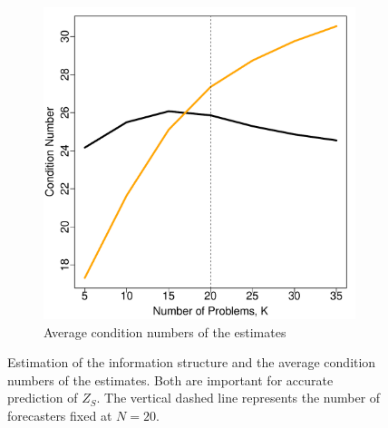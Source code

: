 \documentclass[11pt]{article}
\theoremstyle{definition}
\theoremstyle{definition}
\begin{document}
\begin{figure}[t!]
\begin{subfigure}{0.5\textwidth}
                \includegraphics[width=\textwidth]{simResCond.pdf}
                \caption{Average condition numbers of the estimates}
                                \label{SigmaInv}
        \end{subfigure}
        \caption{Estimation of the information structure and the average  condition numbers of the estimates. Both are important for accurate prediction of $Z_S$. The vertical dashed line represents the number of forecasters fixed at $N = 20$.}
        \label{SigmaEstimation}
\end{figure}
\end{document}

